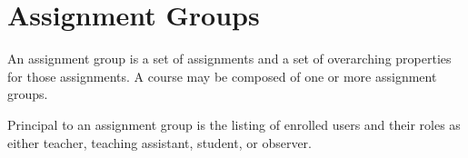 
\section{Assignment Groups}

An assignment group is a set of assignments and a set of overarching properties
for those assignments. A course may be composed of one or more assignment
groups.

Principal to an assignment group is the listing of enrolled users and their
roles as either teacher, teaching assistant, student, or observer.




